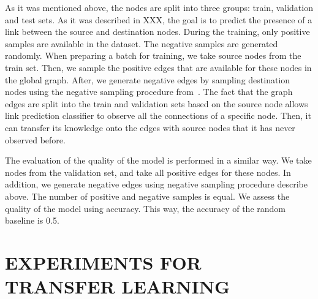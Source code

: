 \documentclass[a4paper,twoside]{article}
\begin{document}
As it was mentioned above, the nodes are split into three groups: train, validation and test sets. As it was described in XXX, the goal is to predict the presence of a link between the source and destination nodes. During the training, only positive samples are available in the dataset. The negative samples are generated randomly. When preparing a batch for training, we take source nodes from the train set. Then, we sample the positive edges that are available for these nodes in the global graph. After, we generate negative edges by sampling destination nodes using the negative sampling procedure from~\cite{mikolov2013distributed}. The fact that the graph edges are split into the train and validation sets based on the source node allows link prediction classifier to observe all the connections of a specific node. Then, it can transfer its knowledge onto the edges with source nodes that it has never observed before.

The evaluation of the quality of the model is performed in a similar way. We take nodes from the validation set, and take all positive edges for these nodes. In addition, we generate negative edges using negative sampling procedure describe above. The number of positive and negative samples is equal. We assess the quality of the model using accuracy. This way, the accuracy of the random baseline is 0.5.

\section{\uppercase{Experiments for Transfer Learning}}
\end{document}
